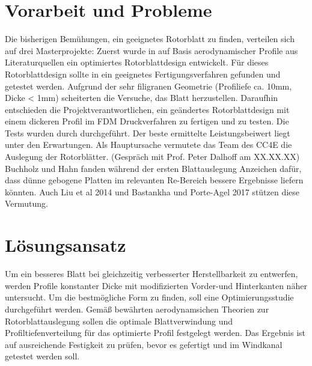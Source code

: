 \section{Vorarbeit und Probleme}
Die bisherigen Bemühungen, ein geeignetes Rotorblatt zu finden, verteilen sich auf drei Masterprojekte: Zuerst wurde in \cite{buchholz_erarbeitung_2020} auf Basis aerodynamischer Profile aus Literaturquellen ein optimiertes Rotorblattdesign entwickelt. Für dieses Rotorblattdesign sollte in \cite{stolla_konstruktion_2020} ein geeignetes Fertigungsverfahren gefunden und getestet werden. Aufgrund der sehr filigranen Geometrie (Profiliefe ca. 10mm, Dicke < 1mm) scheiterten die Versuche, das Blatt herzustellen. Daraufhin entschieden die Projektverantwortlichen, ein geändertes Rotorblattdesign mit einem dickeren Profil im FDM Druckverfahren zu fertigen und zu testen. Die Tests wurden durch \cite{loof_windkanaluntersuchungen_2023} durchgeführt. Der beste ermittelte Leistungsbeiwert liegt unter den Erwartungen. Als Hauptursache vermutete das Team des CC4E die Auslegung der Rotorblätter. (Gespräch mit Prof. Peter Dalhoff am XX.XX.XX) Buchholz und Hahn fanden während der ersten Blattauslegung Anzeichen dafür, dass dünne gebogene Platten im relevanten Re-Bereich bessere Ergebnisse liefern könnten. Auch Liu et al 2014 und Bastankha und Porte-Agel 2017 stützen diese Vermutung.

\section{Lösungsansatz}
Um ein besseres Blatt bei gleichzeitig verbesserter Herstellbarkeit zu entwerfen, werden Profile konstanter Dicke mit modifizierten Vorder-und Hinterkanten näher untersucht. Um die bestmögliche Form zu finden, soll eine Optimierungsstudie durchgeführt werden. Gemäß bewährten aerodynamsichen Theorien zur Rotorblattauslegung sollen die optimale Blattverwindung und Profiltiefenverteilung für das optimierte Profil festgelegt werden. Das Ergebnis ist auf ausreichende Festigkeit zu prüfen, bevor es gefertigt und im Windkanal getestet werden soll.